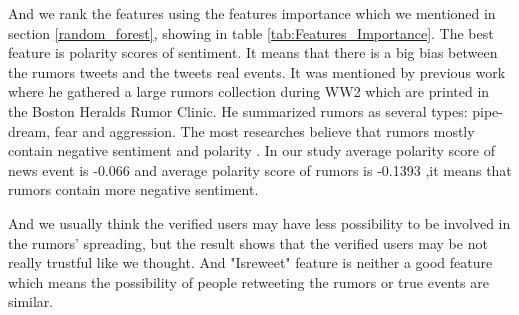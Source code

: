  And we rank the features using the features importance which we mentioned in section \ref{random_forest}, showing in table \ref{tab:Features_Importance}. The best feature is polarity scores of sentiment. It means that there is a big bias between the rumors tweets and the tweets real events. It was mentioned by previous work \cite{allport1947psychology} where he gathered a large rumors collection during WW2 which are printed in the Boston Heralds Rumor Clinic. He summarized rumors as several types:  pipe-dream, fear and aggression. The most researches believe that rumors mostly contain negative sentiment and polarity \cite{sunstein2014rumors}\cite{kwon2013aspects}. In our study average polarity score of news event is -0.066 and average polarity score of rumors is -0.1393 ,it means that rumors contain more negative sentiment. 
 
 And we usually think the verified users may have less possibility to be involved in the rumors' spreading, but the result shows that the verified users may be not really trustful like we thought. And "Isreweet" feature is neither a good feature which means the possibility of people retweeting the rumors or true events are similar.
 
  
 

